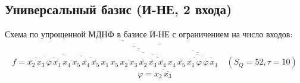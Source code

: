 \documentclass{article}
\begin{document}
\subsection*{Универсальный базис (И-НЕ, 2 входа)}
Схема по упрощенной МДНФ в базисе И-НЕ с ограничением на число входов:
\[f = \overline{\overline{\overline{\overline{\overline{x_{2}} \, x_{3}} \, \overline{\overline{\varphi} \, \overline{x_{1}}}} \, \overline{\overline{x_{4} \, x_{5}} \, \overline{\overline{x_{4}} \, \overline{x_{5}}}}} \, \overline{\overline{\overline{x_{1} \, \overline{\overline{x_{5} \, \overline{\overline{x_{2} \, x_{3}} \, \overline{\overline{x_{2}} \, \overline{\overline{\overline{x_{3}} \, \overline{x_{4}}}}}}}}} \, \overline{x_{4} \, \overline{\overline{\overline{x_{5}} \, \overline{\overline{\overline{x_{1}} \, \varphi} \, \overline{\overline{\varphi} \, x_{1}}}}}}}}}\quad(S_Q = 52, \tau = 10)\]
\[\varphi = \overline{x_{2} \, \overline{x_{3}}}\]
\end{document}
